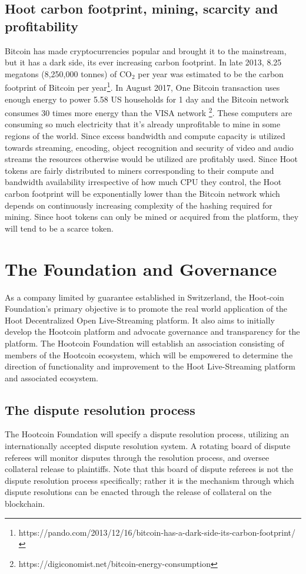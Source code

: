 \documentclass{article}
\begin{document}
\subsection{Hoot carbon footprint, mining, scarcity and profitability}
Bitcoin has made cryptocurrencies popular and brought it to the mainstream, but it has a dark side, its ever increasing carbon footprint. In late 2013, 8.25 megatons (8,250,000 tonnes) of CO$_2$ per year
was estimated to be the carbon footprint of Bitcoin per year\footnote{https://pando.com/2013/12/16/bitcoin-has-a-dark-side-its-carbon-footprint/}. In August 2017, One Bitcoin transaction uses enough energy to power 5.58 US households for 1 day and the  Bitcoin network consumes 30 times more energy than the VISA network \footnote{https://digiconomist.net/bitcoin-energy-consumption}. These
computers are consuming so much electricity that it’s already unprofitable to mine in some regions of the world. Since excess bandwidth and compute capacity is utilized towards streaming, encoding, object recognition and security of video and audio streams the resources otherwise would be utilized are profitably used.  Since Hoot tokens are fairly distributed to miners corresponding to their compute and bandwidth availability irrespective of how much CPU they control, the Hoot carbon footprint will be exponentially lower than the Bitcoin network which depends on continuously increasing complexity of the hashing required for mining. Since hoot tokens can only be mined or acquired from the platform, they will tend to be a scarce token.

\section{The Foundation and Governance} %
\label{sec:the_foundation_and_governance}
As a company limited by guarantee established in Switzerland, the Hoot-coin Foundation's primary objective is to promote the real world application of the Hoot Decentralized Open Live-Streaming platform. It also aims to initially develop the Hootcoin platform and advocate governance and transparency for the platform. The Hootcoin Foundation will establish an association consisting of members of the Hootcoin ecosystem, which will be empowered to determine the direction of functionality and improvement to the Hoot Live-Streaming platform and associated ecosystem.

\subsection{The dispute resolution process} %
\label{sub:the_dispute_resolution_process}
The Hootcoin Foundation will specify a dispute resolution process, utilizing an internationally accepted dispute resolution system. A rotating board of dispute referees will monitor disputes through the resolution process, and oversee collateral release to plaintiffs. Note that this board of dispute referees is not the dispute resolution process specifically; rather it is the mechanism through which dispute resolutions can be enacted through the release of collateral on the blockchain.
\end{document}
